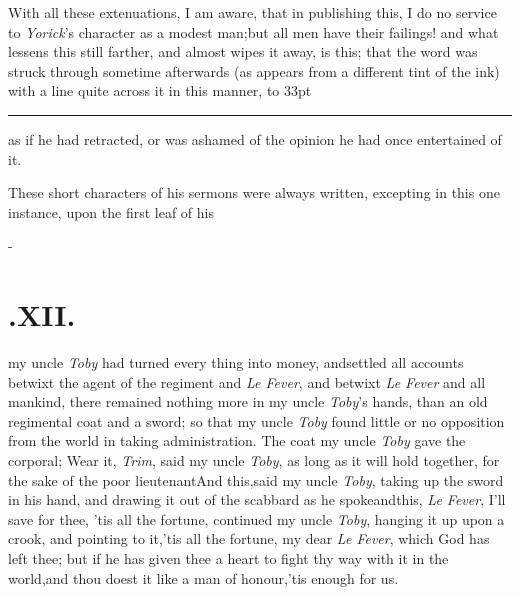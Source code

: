 \documentclass{article}
\begin{document}
With all these extenuations, I am aware, that in publishing
this, I do no service to \textit{Yorick}’s character as a
modest man;\tsk but all men have their failings! and what lessens
this still farther, and almost wipes it away, is this; that the
word was struck through sometime afterwards (as appears from a
different tint of the ink) with a line quite across it in this manner,
\hbox to 33pt{\leaders\hrule width 1pt height 3.4pt depth -3.1pt\hfill}\tsh as if he had retracted, or was
ashamed of the opinion he had once entertained of it.

These short characters of his sermons were always written,
excepting in this one instance, upon the first leaf of his

\vfill{}\eject
\null\kern-\baselineskip
\section{.\enspace XII.}

 my uncle \textit{Toby} had turned
every thing into money, and\break settled all accounts betwixt the agent
of the regiment and \textit{Le Fever}, and betwixt \textit{Le Fever}
and all mankind,\tsh\break
there remained nothing more in my uncle \textit{Toby}’s hands, than an old
regimental coat and a sword; so that my uncle \textit{Toby} found little or no
opposition from the world in taking administration. The coat my uncle \textit{Toby}
gave the corporal;\break
\tsh Wear it, \textit{Trim}, said my uncle \textit{Toby}, as long
as it will hold together, for the sake of the poor lieutenant\tsh And this,\tsh said
my uncle \textit{Toby}, taking up the sword in his hand, and drawing it out of the
scabbard as he spoke\tsk and\break this, \textit{Le Fever}, I’ll save for thee,\tsk
’tis all the fortune, continued my uncle \textit{Toby}, hanging it up upon a
crook, and pointing to it,\tsk ’tis all the fortune, my dear \textit{Le Fever},
which God has left thee;\break
but if he has given thee a heart to fight thy way with it
in the world,\tsk and thou doest it like a man of honour,\tsk ’tis enough for us.
\end{document}
